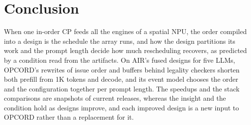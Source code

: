 \section{Conclusion}
\label{sec:conclusion}

When one in-order CP feeds all the engines of a spatial NPU, the order compiled into a design is the schedule the array runs, and how the design partitions its work and the prompt length decide how much rescheduling recovers, as predicted by a condition read from the artifacts.
On AIR's fused designs for five LLMs, OPCORD's rewrites of issue order and buffers behind legality checkers shorten both prefill from 1K tokens and decode, and its event model chooses the order and the configuration together per prompt length.
The speedups and the stack comparisons are snapshots of current releases, whereas the insight and the condition hold as designs improve, and each improved design is a new input to OPCORD rather than a replacement for it.
